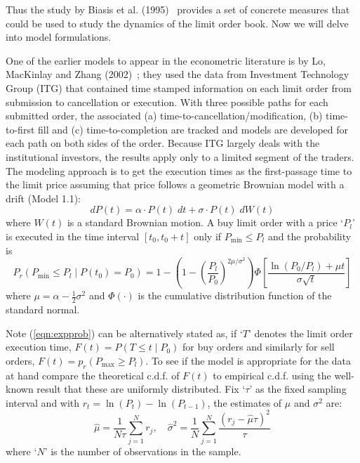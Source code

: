 Thus the study by Biasis et al. (1995)~\cite{spalt} provides a set of concrete measures that could be used to study the dynamics of the limit order book. Now we will delve into model formulations. 


One of the earlier models to appear in the econometric literature is by Lo, MacKinlay and Zhang (2002)~\cite{maczhang}; they used the data from Investment Technology Group (ITG) that contained time stamped information on each limit order from submission to cancellation or execution. With three possible paths for each submitted order, the associated (a) time-to-cancellation/modification, (b) time-to-first fill and (c) time-to-completion are tracked and models are developed for each path on both sides of the order. Because ITG largely deals with the institutional investors, the results apply only to a limited segment of the traders. The modeling approach is to get the execution times as the first-passage time to the limit price assuming that price follows a geometric Brownian model with a drift (Model 1.1):  
	\begin{equation}\label{eqn:dp(t)}
	dP(t)= \alpha \cdot P(t) \; dt + \sigma \cdot P(t) \; dW(t)
	\end{equation}
where $W(t)$ is a standard Brownian motion. A buy limit order with a price `$P_l$' is executed in the time interval $[t_0,t_0+t]$ only if $P_{\text{min}} \leq P_l$ and the probability is
	\begin{equation}\label{eqn:expprob}
	P_r(P_{\text{min}} \leq P_l \;|\; P(t_0)=P_0)= 1- \left(1 - \left(\dfrac{P_l}{P_0}\right)^{2\mu/\sigma^2}\right) \Phi\left[\dfrac{\ln(P_0/P_l) + \mu t}{\sigma \sqrt{t}}\right]
	\end{equation}
where $\mu=\alpha - \frac{1}{2} \sigma^2$ and $\Phi(\cdot)$ is the cumulative distribution function of the standard normal. 

Note (\ref{eqn:expprob}) can be alternatively stated as, if `$T$' denotes the limit order execution time, $F(t)=P(T \leq t \;|\; P_0)$ for buy orders and similarly for sell orders, $F(t)=p_r(P_{\text{max}} \geq P_l)$. To see if the model is appropriate for the data at hand compare the theoretical c.d.f. of $F(t)$ to empirical c.d.f. using the well-known result that these are uniformly distributed. Fix `$\tau$' as the fixed sampling interval and with $r_t=\ln(P_t)-\ln(P_{t-1})$, the estimates of $\mu$ and $\sigma^2$ are:
	\begin{equation}\label{eqn:sampleestm}
	\hat{\mu}= \dfrac{1}{N\tau} \sum_{j=1}^N r_j, \quad \hat{\sigma}^2= \dfrac{1}{N} \sum_{j=1}^N \dfrac{(r_j - \hat{\mu} \tau)^2}{\tau}
	\end{equation}
where `$N$' is the number of observations in the sample. 


